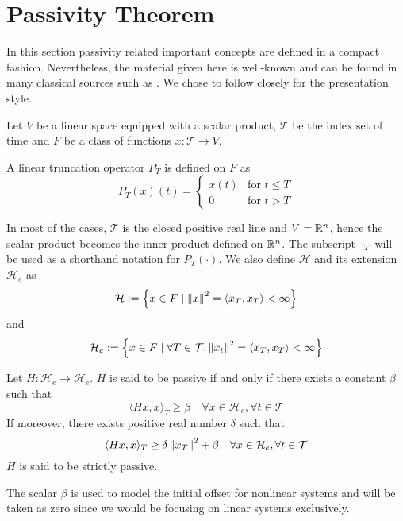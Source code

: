 \section{Passivity Theorem}
In this section passivity related important concepts are defined in a compact fashion. Nevertheless, the material given here 
is well-known and can be found in many classical sources such as \cite{hillmoylan77,desvid,vdschaftbook}. We chose to 
follow \cite{desvid} closely for the presentation style. 

Let $V$ be a linear space equipped with a scalar product, $\mathcal{T}$ be the index set of time and $F$ be a class of functions 
$x:\mathcal{T}\to V$.
\begin{define} A linear truncation operator $P_T$ is defined on $F$ as 
\begin{equation}
P_T(x)(t) = \begin{cases} x(t) &\text{for } t\leq T\\ 0 &\text{for } t>T\end{cases}
\label{eq:apdx:trunc}
\end{equation}
\end{define}

In most of the cases, $\mathcal{T}$ is the closed positive real line and $V=\mathbb{R}^n$, hence the scalar product becomes the inner product 
defined on $\mathbb{R}^n$. The subscript ${\cdot}_T$ will be used as a shorthand notation for $P_T(\cdot)$. We also define $\mathcal{H}$ 
and its extension $\mathcal{H}_e$ as 
\[
\mathcal{H} := \left\{ x\in F\mid \displaystyle \left\| x \right\|^2=\langle x_T,x_T \rangle<\infty \right\}
\]
and
\[
\mathcal{H}_e := \left\{ x\in F\mid \forall T\in\mathcal{T}, \displaystyle \left\| x_t \right\|^2=\langle x_T,x_T \rangle<\infty \right\}
\]



\begin{define}Let $H:\mathcal{H}_e\to\mathcal{H}_e$. $H$ is said to be passive if and only if there exists a constant 
$\beta$ such that
\[
\langle Hx,x \rangle_T \geq \beta\quad \forall x\in\mathcal{H}_e,\forall t\in\mathcal{T}
\]
If moreover, there exists positive real number $\delta$ such that
\[
\langle Hx,x \rangle_T \geq \delta\displaystyle \left\| x_T \right\|^2+ \beta\quad \forall x\in\mathcal{H}_e,\forall t\in\mathcal{T}
\]
$H$ is said to be strictly passive. 
\end{define}
The scalar $\beta$ is used to model the initial offset for nonlinear systems and 
will be taken as zero since we would be focusing on linear systems exclusively. 

